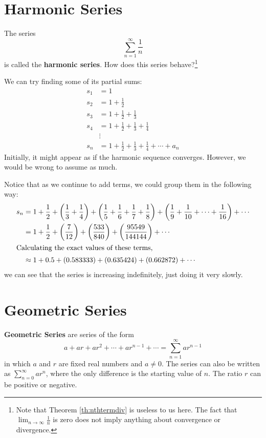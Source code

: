 \section{Harmonic Series}

\begin{ex}
  The series
  \[ \sum_{n=1}^{\infty} \frac{1}{n} \]
  is called the \textbf{harmonic series}. How does this series behave?\footnote{Note that Theorem \ref{th:nthtermdiv} is useless to us here.
  The fact that
  $ \lim_{n \to \infty} \frac{1}{n}$
is zero does not imply anything about convergence or divergence.}

  We can try finding some of its partial sums:
  \begin{align*}
    s_1 & = 1 \\
    s_2 & = 1 + \frac{1}{2} \\
    s_3 & = 1 + \frac{1}{2} + \frac{1}{3} \\
    s_4 & = 1 + \frac{1}{2} + \frac{1}{3} + \frac{1}{4} \\
    &\vdots \\
    s_n & = 1 + \frac{1}{2} + \frac{1}{3} + \frac{1}{4} + \cdots + a_n
  \end{align*}
  Initially, it might appear as if the harmonic sequence converges.
  However, we would be wrong to assume as much.

  Notice that as we continue to add terms, we could group them in the following
  way:
  \begin{align*}
    s_n &= 1 + \frac{1}{2} + \bigg( \frac{1}{3} + \frac{1}{4} \bigg)
    + \bigg( \frac{1}{5} + \frac{1}{6} + \frac{1}{7} + \frac{1}{8} \bigg)
    + \bigg( \frac{1}{9} + \frac{1}{10} + \cdots + \frac{1}{16} \bigg)
    + \cdots\\
    &= 1 + \frac{1}{2} + \bigg( \frac{7}{12} \bigg)
    + \bigg( \frac{533}{840} \bigg)
    + \bigg( \frac{95549}{144144} \bigg)
    + \cdots \\
    \intertext{Calculating the exact values of these terms,}
    &\approx 1+ 0.5 + (0.583333) + (0.635424) + (0.662872) + \cdots
  \end{align*}
  we can see that the series is increasing indefinitely, just doing it very slowly.
  \end{ex}


\section{Geometric Series}

\textbf{Geometric Series} are series of the form
\[a + ar + ar^2 +\cdots +ar^{n-1}+\cdots=\sum_{n=1}^\infty ar^{n-1} \]
in which $a$ and $r$ are fixed real numbers and $a \neq 0$. The series can also
be written as $\sum_{n=0}^\infty ar^n$, where the only difference is the
starting value of $n$. The ratio $r$ can be positive or negative.

